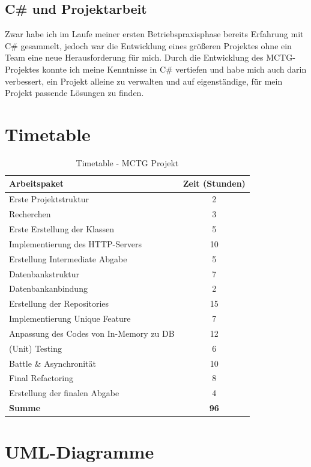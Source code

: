 \documentclass[a4paper, 12pt]{article}
\begin{document}
\subsection{C\# und Projektarbeit}
Zwar habe ich im Laufe meiner ersten Betriebspraxisphase bereits Erfahrung mit C\# gesammelt, jedoch war die Entwicklung eines größeren Projektes ohne ein Team eine neue Herausforderung für mich.
Durch die Entwicklung des MCTG-Projektes konnte ich meine Kenntnisse in C\# vertiefen und habe mich auch darin verbessert, ein Projekt alleine zu verwalten und auf eigenständige, für mein Projekt passende Lösungen zu finden.
\pagebreak

\section{Timetable}
\begin{table}[h!]
\centering
\begin{tabular}{|l|c|}
\hline
\textbf{Arbeitspaket} & \textbf{Zeit (Stunden)} \\ \hline
Erste Projektstruktur & 2 \\ \hline
Recherchen & 3 \\ \hline
Erste Erstellung der Klassen & 5 \\ \hline
Implementierung des HTTP-Servers & 10 \\ \hline
Erstellung Intermediate Abgabe & 5 \\ \hline
Datenbankstruktur & 7 \\ \hline
Datenbankanbindung & 2 \\ \hline
Erstellung der Repositories & 15 \\ \hline
Implementierung Unique Feature & 7 \\ \hline
Anpassung des Codes von In-Memory zu DB & 12 \\ \hline
(Unit) Testing & 6 \\ \hline
Battle \& Asynchronität & 10 \\ \hline
Final Refactoring & 8 \\ \hline
Erstellung der finalen Abgabe & 4 \\ \hline
\textbf{Summe} & \textbf{96} \\ \hline
\end{tabular}
\caption{Timetable - MCTG Projekt}
\label{tab:timetable}
\end{table}

\pagebreak

\section{UML-Diagramme}
\end{document}
